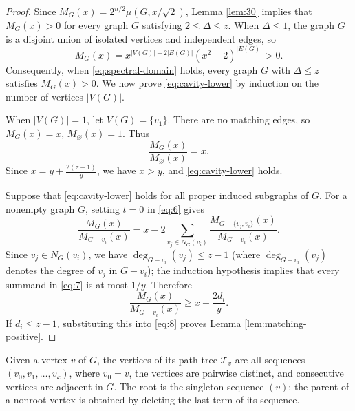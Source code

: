 \documentclass[11pt, a4paper]{article}
\begin{document}
\begin{proof}
Since $M_G(x)=2^{n/2}\mu(G,x/\sqrt2)$,
Lemma \ref{lem:30} implies that $M_G(x)>0$ for every graph $G$ satisfying $2 \leq \Delta \leq z$.
When $\Delta \le1$, the graph $G$ is a disjoint union of isolated vertices and independent edges, so
\[
M_G(x)=x^{|V(G)|-2|E(G)|}(x^2-2)^{|E(G)|}>0.
\]
Consequently, when \eqref{eq:spectral-domain} holds, every graph $G$ with $\Delta \leq z$
satisfies $M_G(x)>0$.
We now prove \eqref{eq:cavity-lower} by induction on the number of vertices $|V(G)|$.

When $|V(G)|=1$, let $V(G)=\{v_1\}$. There are no matching edges, so
$M_G(x)=x$, $M_\varnothing(x)=1$.
Thus
\[
\frac{M_G(x)}{M_\varnothing(x)}=x.
\]
Since $x=y+\frac{2(z-1)}y$, we have $x>y$, and \eqref{eq:cavity-lower} holds.

Suppose that \eqref{eq:cavity-lower} holds for all proper induced subgraphs of $G$.
For a nonempty graph $G$, setting $t=0$ in \eqref{eq:6} gives
\begin{equation}\label{eq:7}
 \frac{M_G(x)}{M_{G-v_i}(x)}
 =x-2\sum_{v_j\in N_G(v_i)}
       \frac{M_{G-\{v_j,v_i\}}(x)}{M_{G-v_i}(x)}.
\end{equation}
Since $v_j\in N_G(v_i)$,
we have $\deg_{G-v_i}(v_j)\leq z-1$ (where $\deg_{G-v_i}(v_j)$ denotes
the degree of $v_j$ in $G-v_i$);
the induction hypothesis implies that every summand in \eqref{eq:7} is at most $1/y$.
Therefore
\begin{equation}\label{eq:8}
 \frac{M_G(x)}{M_{G-v_i}(x)}
 \geq x-\frac{2d_i}y.
\end{equation}
If $d_i\leq z-1$, substituting this into \eqref{eq:8} proves Lemma \ref{lem:matching-positive}.
\end{proof}

\begin{defi}
Given a vertex $v$ of $G$, the vertices of its path tree $\mathcal{T}_v$ are all sequences
$(v_0,v_1,\ldots,v_k)$, where $v_0=v$, the vertices are pairwise distinct, and consecutive vertices are adjacent in $G$.
The root is the singleton sequence $(v)$; the parent of a nonroot vertex is obtained by deleting the last term of its sequence.
\end{defi}
\end{document}
